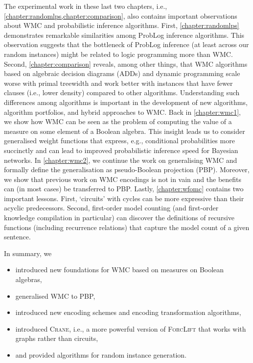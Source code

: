 The experimental work in these last two chapters, i.e.,
\cref{chapter:randomlps,chapter:comparison}, also contains important
observations about WMC and probabilistic inference algorithms. First,
\cref{chapter:randomlps} demonstrates remarkable similarities among ProbLog
inference algorithms. This observation suggests that the bottleneck of ProbLog
inference (at least across our random instances) might be related to logic
programming more than WMC\@. Second, \cref{chapter:comparison} reveals, among
other things, that WMC algorithms based on algebraic decision diagrams (ADDs)
and dynamic programming scale worse with primal treewidth and work better with
instances that have fewer clauses (i.e., lower density) compared to other
algorithms. Understanding such differences among algorithms is important in the
development of new algorithms, algorithm portfolios, and hybrid approaches to
WMC\@. Back in \cref{chapter:wmc1}, we show how WMC can be seen as the problem
of computing the value of a measure on some element of a Boolean algebra. This
insight leads us to consider generalised weight functions that express, e.g.,
conditional probabilities more succinctly and can lead to improved probabilistic
inference speed for Bayesian networks. In \cref{chapter:wmc2}, we continue the
work on generalising WMC and formally define the generalisation as
pseudo-Boolean projection (PBP). Moreover, we show that previous work on WMC
encodings is not in vain and the benefits can (in most cases) be transferred to
PBP\@. Lastly, \cref{chapter:wfomc} contains two important lessons. First,
`circuits' with cycles can be more expressive than their acyclic predecessors.
Second, first-order model counting (and first-order knowledge compilation in
particular) can discover the definitions of recursive functions (including
recurrence relations) that capture the model count of a given sentence.

In summary, we
\begin{itemize}
  \item introduced new foundations for WMC based on measures on Boolean
        algebras,
  \item generalised WMC to PBP,
  \item introduced new encoding schemes and encoding transformation algorithms,
  \item introduced \textsc{Crane}, i.e., a more powerful version of
        \textsc{ForcLift} that works with graphs rather than circuits,
  \item and provided algorithms for random instance generation.
\end{itemize}

